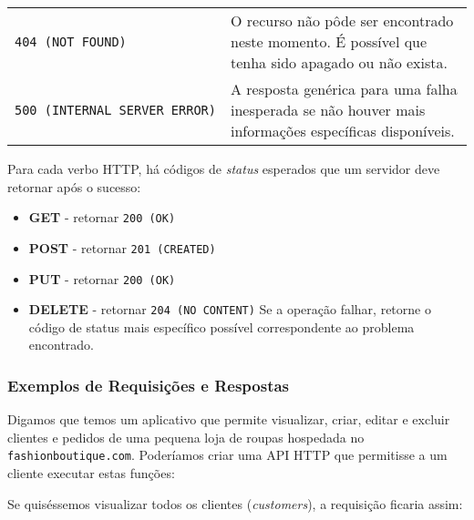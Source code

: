 \documentclass[12pt, a4paper
]{article}
\providecommand{\tightlist}{%
  \setlength{\itemsep}{0pt}\setlength{\parskip}{0pt}}
\begin{document}
\begin{longtable}[]{@{}ll@{}}
\begin{minipage}[t]{0.47\columnwidth}\raggedright
\texttt{404\ (NOT\ FOUND)}\strut
\end{minipage} & \begin{minipage}[t]{0.47\columnwidth}\raggedright
O recurso não pôde ser encontrado neste momento. É possível que tenha
sido apagado ou não exista.\strut
\end{minipage}\tabularnewline
\begin{minipage}[t]{0.47\columnwidth}\raggedright
\texttt{500\ (INTERNAL\ SERVER\ ERROR)}\strut
\end{minipage} & \begin{minipage}[t]{0.47\columnwidth}\raggedright
A resposta genérica para uma falha inesperada se não houver mais
informações específicas disponíveis.\strut
\end{minipage}\tabularnewline
\bottomrule
\end{longtable}

Para cada verbo HTTP, há códigos de \emph{status} esperados que um
servidor deve retornar após o sucesso:

\begin{itemize}
\tightlist
\item
  \textbf{GET} - retornar \texttt{200\ (OK)}
\item
  \textbf{POST} - retornar \texttt{201\ (CREATED)}
\item
  \textbf{PUT} - retornar \texttt{200\ (OK)}
\item
  \textbf{DELETE} - retornar \texttt{204\ (NO\ CONTENT)} Se a operação
  falhar, retorne o código de status mais específico possível
  correspondente ao problema encontrado.
\end{itemize}

\hypertarget{exemplos-de-requisiuxe7uxf5es-e-respostas}{%
\subsubsection{Exemplos de Requisições e
Respostas}\label{exemplos-de-requisiuxe7uxf5es-e-respostas}}

Digamos que temos um aplicativo que permite visualizar, criar, editar e
excluir clientes e pedidos de uma pequena loja de roupas hospedada no
\texttt{fashionboutique.com}. Poderíamos criar uma API HTTP que
permitisse a um cliente executar estas funções:

Se quiséssemos visualizar todos os clientes (\emph{customers}), a
requisição ficaria assim:
\end{document}
